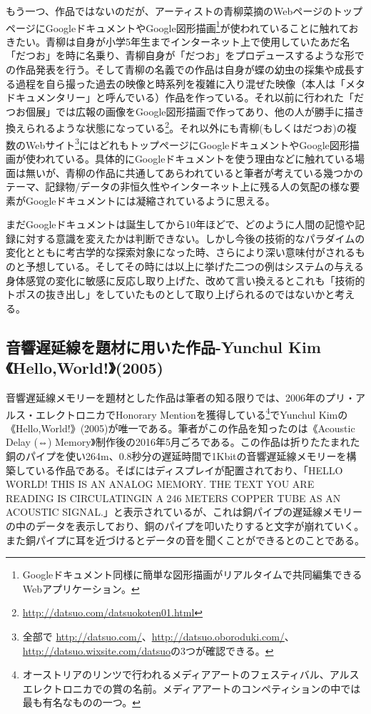 \documentclass[a4paper,report]{jsbook}
\begin{document}
もう一つ、作品ではないのだが、アーティストの青柳菜摘のWebページのトップページにGoogleドキュメントやGoogle図形描画\footnote{Googleドキュメント同様に簡単な図形描画がリアルタイムで共同編集できるWebアプリケーション。}が使われていることに触れておきたい。青柳は自身が小学5年生までインターネット上で使用していたあだ名「だつお」を時に名乗り、青柳自身が「だつお」をプロデュースするような形での作品発表を行う。そして青柳の名義での作品は自身が蝶の幼虫の採集や成長する過程を自ら撮った過去の映像と時系列を複雑に入り混ぜた映像（本人は「メタドキュメンタリー」と呼んでいる）作品を作っている\autocite{aoyagi:icc}。それ以前に行われた「だつお個展」では広報の画像をGoogle図形描画で作ってあり、他の人が勝手に描き換えられるような状態になっている\footnote{\url{http://datsuo.com/datsuokoten01.html}}。それ以外にも青柳(もしくはだつお)の複数のWebサイト\footnote{全部で
  \url{http://datsuo.com/}、\url{http://datsuo.oboroduki.com/}、\url{http://datsuo.wixsite.com/datsuo}の3つが確認できる。}にはどれもトップページにGoogleドキュメントやGoogle図形描画が使われている。具体的にGoogleドキュメントを使う理由などに触れている場面は無いが、青柳の作品に共通してあらわれていると筆者が考えている幾つかのテーマ、記録物/データの非恒久性やインターネット上に残る人の気配の様な要素がGoogleドキュメントには凝縮されているように思える。

まだGoogleドキュメントは誕生してから10年ほどで、どのように人間の記憶や記録に対する意識を変えたかは判断できない。しかし今後の技術的なパラダイムの変化とともに考古学的な探索対象になった時、さらにより深い意味付がされるものと予想している。そしてその時には以上に挙げた二つの例はシステムの与える身体感覚の変化に敏感に反応し取り上げた、改めて言い換えるとこれも「技術的トポスの抜き出し」をしていたものとして取り上げられるのではないかと考える。

\subsection{音響遅延線を題材に用いた作品-Yunchul
Kim《Hello,World!》(2005)}\label{ux97f3ux97ffux9045ux5ef6ux7ddaux3092ux984cux6750ux306bux7528ux3044ux305fux4f5cux54c1-yunchul-kimhelloworld2005}

音響遅延線メモリーを題材とした作品は筆者の知る限りでは、2006年のプリ・アルス・エレクトロニカでHonorary
Mentionを獲得している\footnote{オーストリアのリンツで行われるメディアアートのフェスティバル、アルスエレクトロニカでの賞の名前。メディアアートのコンペティションの中では最も有名なものの一つ。}でYunchul
Kimの《Hello,World!》(2005)が唯一である。筆者がこの作品を知ったのは《Acoustic
Delay (⇔)
Memory》制作後の2016年5月ごろである。この作品は折りたたまれた銅のパイプを使い264m、0.8秒分の遅延時間で1Kbitの音響遅延線メモリーを構築している作品である。そばにはディスプレイが配置されており、「HELLO
WORLD! THIS IS AN ANALOG MEMORY. THE TEXT YOU ARE READING IS
CIRCULATINGIN A 246 METERS COPPER TUBE AS AN ACOUSTIC
SIGNAL.」と表示されているが、これは銅パイプの遅延線メモリーの中のデータを表示しており、銅のパイプを叩いたりすると文字が崩れていく。また銅パイプに耳を近づけるとデータの音を聞くことができるとのことである。
\end{document}
